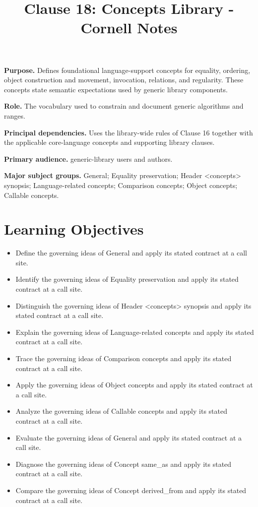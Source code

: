 \documentclass[11pt,letterpaper]{article}
\title{Clause 18: Concepts Library - Cornell Notes}
\author{}
\date{}
\begin{document}
\maketitle
\begin{CornellReferenceOrientationBox}
\textbf{Purpose.} Defines foundational language-support concepts for equality, ordering, object construction and movement, invocation, relations, and regularity. These concepts state semantic expectations used by generic library components.
\par\textbf{Role.} The vocabulary used to constrain and document generic algorithms and ranges.
\par\textbf{Principal dependencies.} Uses the library-wide rules of Clause 16 together with the applicable core-language concepts and supporting library clauses.
\par\textbf{Primary audience.} generic-library users and authors.
\par\textbf{Major subject groups.} General; Equality preservation; Header <concepts> synopsis; Language-related concepts; Comparison concepts; Object concepts; Callable concepts.
\end{CornellReferenceOrientationBox}
\section{Learning Objectives}
\begin{itemize}[label=\textcolor{CornellReferenceTeal}{$\blacktriangleright$}]
\item Define the governing ideas of General and apply its stated contract at a call site.
\item Identify the governing ideas of Equality preservation and apply its stated contract at a call site.
\item Distinguish the governing ideas of Header <concepts> synopsis and apply its stated contract at a call site.
\item Explain the governing ideas of Language-related concepts and apply its stated contract at a call site.
\item Trace the governing ideas of Comparison concepts and apply its stated contract at a call site.
\item Apply the governing ideas of Object concepts and apply its stated contract at a call site.
\item Analyze the governing ideas of Callable concepts and apply its stated contract at a call site.
\item Evaluate the governing ideas of General and apply its stated contract at a call site.
\item Diagnose the governing ideas of Concept same\_\allowbreak{}as and apply its stated contract at a call site.
\item Compare the governing ideas of Concept derived\_\allowbreak{}from and apply its stated contract at a call site.
\end{itemize}
\end{document}
